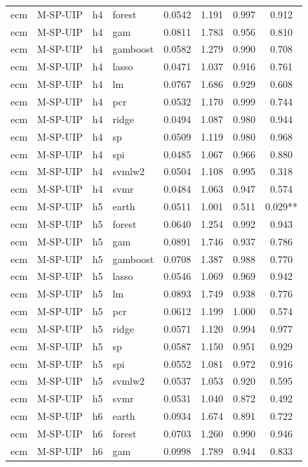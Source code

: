\begin{ThreePartTable}
\begin{longtable}[t]{llclcccc}
ecm & M-SP-UIP & h4 & forest & 0.0542 & 1.191 & 0.997 & 0.912\\
ecm & M-SP-UIP & h4 & gam & 0.0811 & 1.783 & 0.956 & 0.810\\
ecm & M-SP-UIP & h4 & gamboost & 0.0582 & 1.279 & 0.990 & 0.708\\
ecm & M-SP-UIP & h4 & lasso & 0.0471 & 1.037 & 0.916 & 0.761\\
ecm & M-SP-UIP & h4 & lm & 0.0767 & 1.686 & 0.929 & 0.608\\
ecm & M-SP-UIP & h4 & pcr & 0.0532 & 1.170 & 0.999 & 0.744\\
ecm & M-SP-UIP & h4 & ridge & 0.0494 & 1.087 & 0.980 & 0.944\\
ecm & M-SP-UIP & h4 & sp & 0.0509 & 1.119 & 0.980 & 0.968\\
ecm & M-SP-UIP & h4 & spi & 0.0485 & 1.067 & 0.966 & 0.880\\
ecm & M-SP-UIP & h4 & svmlw2 & 0.0504 & 1.108 & 0.995 & 0.318\\
ecm & M-SP-UIP & h4 & svmr & 0.0484 & 1.063 & 0.947 & 0.574\\
\addlinespace
ecm & M-SP-UIP & h5 & earth & 0.0511 & 1.001 & 0.511 & 0.029**\\
ecm & M-SP-UIP & h5 & forest & 0.0640 & 1.254 & 0.992 & 0.943\\
ecm & M-SP-UIP & h5 & gam & 0.0891 & 1.746 & 0.937 & 0.786\\
ecm & M-SP-UIP & h5 & gamboost & 0.0708 & 1.387 & 0.988 & 0.770\\
ecm & M-SP-UIP & h5 & lasso & 0.0546 & 1.069 & 0.969 & 0.942\\
ecm & M-SP-UIP & h5 & lm & 0.0893 & 1.749 & 0.938 & 0.776\\
ecm & M-SP-UIP & h5 & pcr & 0.0612 & 1.199 & 1.000 & 0.574\\
ecm & M-SP-UIP & h5 & ridge & 0.0571 & 1.120 & 0.994 & 0.977\\
ecm & M-SP-UIP & h5 & sp & 0.0587 & 1.150 & 0.951 & 0.929\\
ecm & M-SP-UIP & h5 & spi & 0.0552 & 1.081 & 0.972 & 0.916\\
ecm & M-SP-UIP & h5 & svmlw2 & 0.0537 & 1.053 & 0.920 & 0.595\\
ecm & M-SP-UIP & h5 & svmr & 0.0531 & 1.040 & 0.872 & 0.492\\
\addlinespace
ecm & M-SP-UIP & h6 & earth & 0.0934 & 1.674 & 0.891 & 0.722\\
ecm & M-SP-UIP & h6 & forest & 0.0703 & 1.260 & 0.990 & 0.946\\
ecm & M-SP-UIP & h6 & gam & 0.0998 & 1.789 & 0.944 & 0.833\\

\end{longtable}
\end{ThreePartTable}
